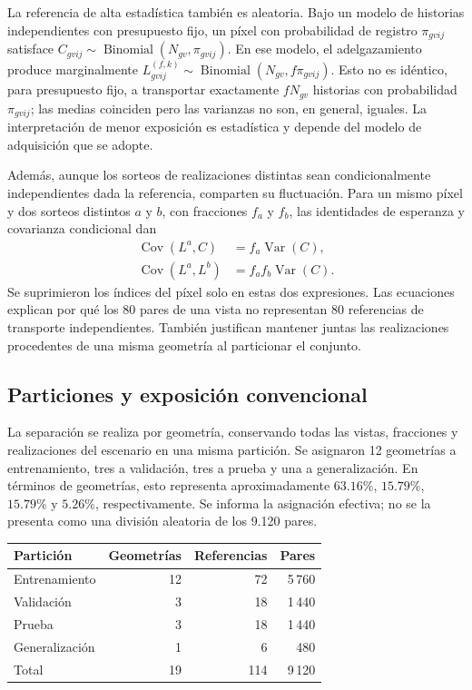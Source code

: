 \documentclass[11pt,a4paper]{article}
\newcommand{\Var}{\operatorname{Var}}
\newcommand{\Cov}{\operatorname{Cov}}
\begin{document}
La referencia de alta estadística también es aleatoria. Bajo un modelo de historias independientes con presupuesto fijo, un píxel con probabilidad de registro $\pi_{gvij}$ satisface $C_{gvij}\sim\operatorname{Binomial}(N_{gv},\pi_{gvij})$. En ese modelo, el adelgazamiento produce marginalmente $L^{(f,k)}_{gvij}\sim\operatorname{Binomial}(N_{gv},f\pi_{gvij})$. Esto no es idéntico, para presupuesto fijo, a transportar exactamente $fN_{gv}$ historias con probabilidad $\pi_{gvij}$; las medias coinciden pero las varianzas no son, en general, iguales. La interpretación de menor exposición es estadística y depende del modelo de adquisición que se adopte.

Además, aunque los sorteos de realizaciones distintas sean condicionalmente independientes dada la referencia, comparten su fluctuación. Para un mismo píxel y dos sorteos distintos $a$ y $b$, con fracciones $f_a$ y $f_b$, las identidades de esperanza y covarianza condicional dan
\begin{align}
 \Cov(L^{a},C)&=f_a\Var(C),\\
 \Cov(L^{a},L^{b})&=f_af_b\Var(C).
 \label{eq:dependencia}
\end{align}
Se suprimieron los índices del píxel solo en estas dos expresiones. Las ecuaciones explican por qué los 80 pares de una vista no representan 80 referencias de transporte independientes. También justifican mantener juntas las realizaciones procedentes de una misma geometría al particionar el conjunto.

\subsection{Particiones y exposición convencional}

La separación se realiza por geometría, conservando todas las vistas, fracciones y realizaciones del escenario en una misma partición. Se asignaron 12 geometrías a entrenamiento, tres a validación, tres a prueba y una a generalización. En términos de geometrías, esto representa aproximadamente $63.16\%$, $15.79\%$, $15.79\%$ y $5.26\%$, respectivamente. Se informa la asignación efectiva; no se la presenta como una división aleatoria de los 9.120 pares.

\begin{center}
\begin{tabular}{lrrr}
\toprule Partición & Geometrías & Referencias & Pares\\\midrule
Entrenamiento &12&72&5\,760\\
Validación &3&18&1\,440\\
Prueba &3&18&1\,440\\
Generalización &1&6&480\\\midrule
Total &19&114&9\,120\\\bottomrule
\end{tabular}
\end{center}
\end{document}
